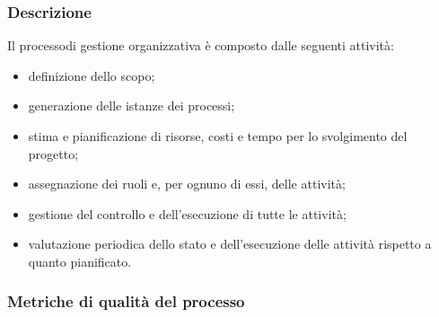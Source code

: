 		\subsubsection{Descrizione}
			Il processo\glosp di gestione organizzativa è composto dalle seguenti attività:
			\begin{itemize}
				\item definizione dello scopo;
				\item generazione delle istanze dei processi\glo;
				\item stima e pianificazione di risorse, costi e tempo per lo svolgimento del progetto\glo;
				\item assegnazione dei ruoli e, per ognuno di essi, delle attività;
				\item gestione del controllo e dell'esecuzione di tutte le attività;
				\item valutazione periodica dello stato e dell'esecuzione delle attività rispetto a quanto pianificato.
			\end{itemize}
		\subsubsection{Metriche di qualità del processo}
